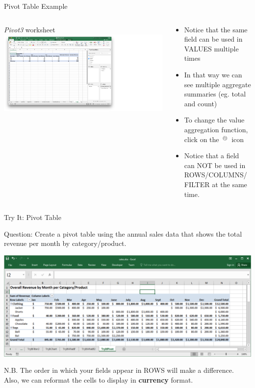 \documentclass[xcolor=svgnames, handout]{beamer}
\begin{document}
\begin{frame}{Pivot Table Example}
\begin{columns}[T] %
\begin{column}{.48\textwidth}
\textit{Pivot3} worksheet
{\includegraphics[width=1.8\textwidth]{pivotThree}}
\end{column}%
\hfill%
\begin{column}{.48\textwidth}
\vspace{1em}
\begin{itemize}
\item Notice that the same field can be used in VALUES multiple times
\item In that way we can see multiple aggregate summaries (eg. total and count)

\item To change the value aggregation function, click on the  \includegraphics[width=1em]{img/i.png}\ icon
\item Notice that a field can NOT be used in ROWS/COLUMNS/FILTER at the same time.
\end{itemize}
\end{column}%
\end{columns}
\end{frame}



\begin{frame}{Try It: Pivot Table}
\begin{exampleblock}{Question:} Create a pivot table using the annual sales data that shows the total revenue per month by category/product. 
\end{exampleblock}
\begin{center}
\includegraphics[width=.9\textwidth]{TryItPivot.png}
\end{center}
N.B. The order in which your fields appear in ROWS will make a difference.  Also, we can reformat the cells to display in {\bf currency} format.
\end{frame}
\end{document}
